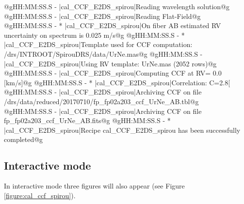 \begin{cmdboxprintspecial}[fontupper=\tiny, fontlower=\tiny]
@gHH:MM:SS.S -   |cal_CCF_E2DS_spirou|Reading wavelength solution@g
@gHH:MM:SS.S -   |cal_CCF_E2DS_spirou|Reading Flat-Field@g
@gHH:MM:SS.S - * |cal_CCF_E2DS_spirou|On fiber AB estimated RV uncertainty on spectrum is 0.025 m/s@g
@gHH:MM:SS.S - * |cal_CCF_E2DS_spirou|Template used for CCF computation: /drs/INTROOT/SpirouDRS/data/UrNe.mas@g
@gHH:MM:SS.S -   |cal_CCF_E2DS_spirou|Using RV template: UrNe.mas (2052 rows)@g
@gHH:MM:SS.S -   |cal_CCF_E2DS_spirou|Computing CCF at RV=    0.0 [km/s]@g
@gHH:MM:SS.S - * |cal_CCF_E2DS_spirou|Correlation: C=2.8[%
@gHH:MM:SS.S -   |cal_CCF_E2DS_spirou|Archiving CCF on file /drs/data/reduced/20170710/fp_fp02a203_ccf_UrNe_AB.tbl@g
@gHH:MM:SS.S -   |cal_CCF_E2DS_spirou|Archiving CCF on file fp_fp02a203_ccf_UrNe_AB.fits@g
@gHH:MM:SS.S - * |cal_CCF_E2DS_spirou|Recipe cal_CCF_E2DS_spirou has been successfully completed@g
\end{cmdboxprintspecial}


\newpage
\subsection{Interactive mode}

\noindent In interactive mode three figures will also appear (see Figure \ref{figure:cal_ccf_spirou}).

